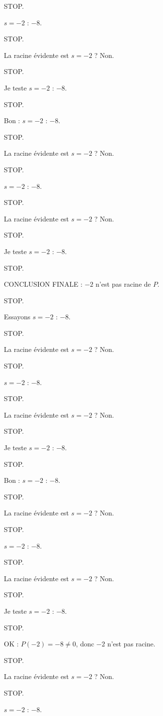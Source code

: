 \documentclass[11pt]{article}
\begin{document}
\begin{exoresolu}
\begin{enumerate}
STOP. 

$s = -2$ : $-8$. 

STOP. 

La racine évidente est $s = -2$ ? Non. 

STOP. 

Je teste $s = -2$ : $-8$. 

STOP. 

Bon : $s = -2$ : $-8$. 

STOP. 

La racine évidente est $s = -2$ ? Non. 

STOP. 

$s = -2$ : $-8$. 

STOP. 

La racine évidente est $s = -2$ ? Non. 

STOP. 

Je teste $s = -2$ : $-8$. 

STOP. 

CONCLUSION FINALE : $-2$ n'est pas racine de $P$. 

STOP. 

Essayons $s = -2$ : $-8$. 

STOP. 

La racine évidente est $s = -2$ ? Non. 

STOP. 

$s = -2$ : $-8$. 

STOP. 

La racine évidente est $s = -2$ ? Non. 

STOP. 

Je teste $s = -2$ : $-8$. 

STOP. 

Bon : $s = -2$ : $-8$. 

STOP. 

La racine évidente est $s = -2$ ? Non. 

STOP. 

$s = -2$ : $-8$. 

STOP. 

La racine évidente est $s = -2$ ? Non. 

STOP. 

Je teste $s = -2$ : $-8$. 

STOP. 

OK : $P(-2) = -8 \neq 0$, donc $-2$ n'est pas racine. 

STOP. 

La racine évidente est $s = -2$ ? Non. 

STOP. 

$s = -2$ : $-8$. 


\end{enumerate}
\end{exoresolu}
\end{document}
